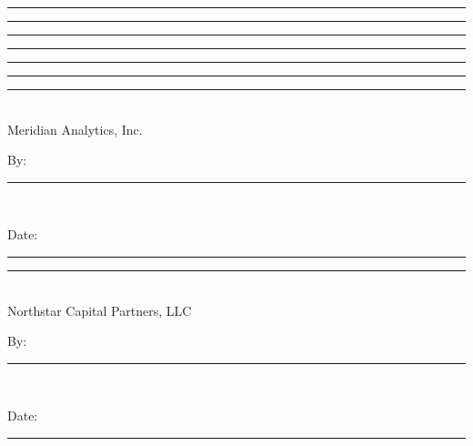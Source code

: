 \vspace{0.8em}
 \quad \rule{4cm}{0.3pt}

\vspace{0.8em}

\smallskip
\noindent\rule{\textwidth}{0.3pt}
\noindent\rule{\textwidth}{0.3pt}
\noindent\rule{\textwidth}{0.3pt}

\vspace{1em}

\smallskip
\noindent\rule{\textwidth}{0.3pt}
\noindent\rule{\textwidth}{0.3pt}

\vspace{2em}
\noindent
\begin{minipage}[t]{0.48\textwidth}
  \centering
  \rule{\linewidth}{0.3pt}\\[4pt]
  {\footnotesize\color{medium}Meridian Analytics, Inc.}\\[2pt]
  {\footnotesize\color{medium}By: \rule{3cm}{0.3pt}}\\[2pt]
  {\footnotesize\color{medium}Date: \rule{2cm}{0.3pt}}
\end{minipage}
\hfill
\begin{minipage}[t]{0.48\textwidth}
  \centering
  \rule{\linewidth}{0.3pt}\\[4pt]
  {\footnotesize\color{medium}Northstar Capital Partners, LLC}\\[2pt]
  {\footnotesize\color{medium}By: \rule{3cm}{0.3pt}}\\[2pt]
  {\footnotesize\color{medium}Date: \rule{2cm}{0.3pt}}
\end{minipage}

\newpage
